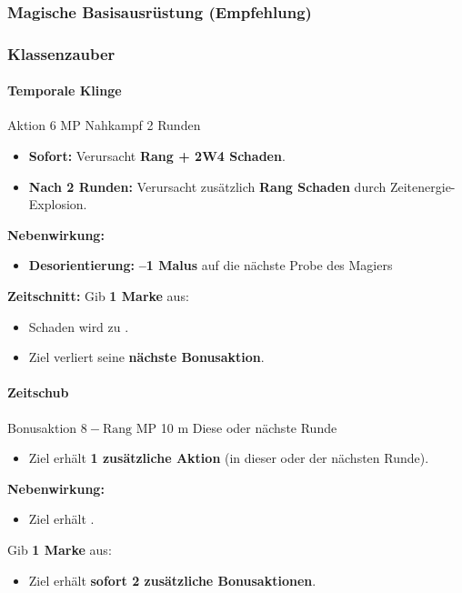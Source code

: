 \subsubsection*{Magische Basisausrüstung (Empfehlung)}

\subsubsection*{Klassenzauber}

\paragraph*{Temporale Klinge}

\spellcard
{}
{Aktion}
{6 MP}
{Nahkampf}
{2 Runden}
{
	\begin{itemize}
		\item \textbf{Sofort:} Verursacht \textbf{Rang + 2W4 Schaden}.
		\item \textbf{Nach 2 Runden:} Verursacht zusätzlich \textbf{Rang Schaden}
		durch Zeitenergie-Explosion.
	\end{itemize}
	
	\medskip
	\textbf{Nebenwirkung:}
	\begin{itemize}
		\item \textbf{Desorientierung:} \textbf{–1 Malus} auf die nächste Probe des Magiers
	\end{itemize}
}
{
	\textbf{Zeitschnitt:}
	Gib \textbf{1 Marke} aus:
	\begin{itemize}
		\item Schaden wird zu .
		\item Ziel verliert seine \textbf{nächste Bonusaktion}.
	\end{itemize}
}

\paragraph*{Zeitschub}

\spellcard
{}
{Bonusaktion}
{$8 - \text{Rang}$ MP}
{10 m}
{Diese oder nächste Runde}
{
	\begin{itemize}
		\item Ziel erhält \textbf{1 zusätzliche Aktion}
		(in dieser oder der nächsten Runde).
	\end{itemize}
	
	\medskip
	\textbf{Nebenwirkung:}
	\begin{itemize}
		\item Ziel erhält .
	\end{itemize}
}
{
	Gib \textbf{1 Marke} aus:
	\begin{itemize}
		\item Ziel erhält \textbf{sofort 2 zusätzliche Bonusaktionen}.
	\end{itemize}
}

